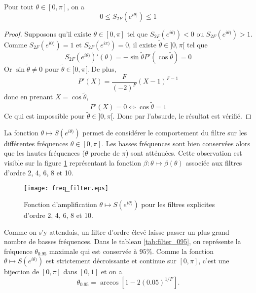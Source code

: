 \begin{proposition}
Pour tout $\theta \in [0, \pi]$, on a 
\begin{equation}
0 \leq S_{2F}(e^{i\theta)}) \leq 1
\end{equation}
\label{prop:ampli_ftr}
\end{proposition}

\begin{proof}
Supposons qu'il existe $\theta \in [0, \pi]$ tel que $S_{2F}(e^{i\theta)}) < 0$ ou $S_{2F}(e^{i\theta)}) > 1$. Comme $S_{2F}(e^{i 0)})=1$ et $S_{2F}(e^{i\pi)}) = 0$, il existe $\tilde{\theta} \in ]0, \pi[$ tel que 
\begin{equation}
S_{2F}(e^{i\theta)})'(\theta) = - \sin \tilde{\theta} P'(\cos \tilde{\theta} ) = 0
\end{equation}
Or $\sin \tilde{\theta} \neq 0$ pour $\tilde{\theta} \in ]0, \pi[$.
De plus, 
\begin{equation}
P'(X) = \dfrac{F}{(-2)^F}(X-1)^{F-1}
\end{equation}
donc en prenant $X = \cos \tilde{\theta}$,
\begin{equation*}
P'(X) = 0 \Leftrightarrow \cos \tilde{\theta} = 1
\end{equation*}
Ce qui est impossible pour $\tilde{\theta} \in ]0, \pi[$. Donc par l'absurde, le résultat est vérifié.
\end{proof}

La fonction $\theta \mapsto S(e^{i\theta)})$ permet de considérer le comportement du filtre sur les différentes fréquences $\theta \in [0, \pi]$. Les basses fréquences sont bien conservées alors que les hautes fréquences ($\theta$ proche de $\pi$) sont atténuées. Cette observation est visible sur la figure \ref{fig:freq_filter} représentant la fonction $\beta : \theta \mapsto \beta(\theta)$ associée aux filtres d'ordre 2, 4, 6, 8 et 10. 

\begin{figure}[htbp]
\begin{center}
\texttt{[image: freq\_filter.eps]}
\end{center}
\caption{Fonction d'amplification $\theta \mapsto S(e^{i\theta)})$ pour les filtres explicites d'ordre 2, 4, 6, 8 et 10.}
\label{fig:freq_filter}
\end{figure}
Comme on s'y attendais, un filtre d'ordre élevé laisse passer un plus grand nombre de basses fréquences. Dans le tableau \ref{tab:filter_095}, on représente la fréquence $\theta_{0.95}$ maximale qui est conservée à $95\%$. Comme la fonction $\theta \mapsto S(e^{i\theta)})$ est strictement décroissante et continue sur $[0,\pi]$, c'est une bijection de $[0,\pi]$ dans $[0,1]$ et on a 
\begin{equation}
\theta_{0.95} = \arccos \left[ 1-2 (0.05)^{1/F} \right].
\end{equation}

